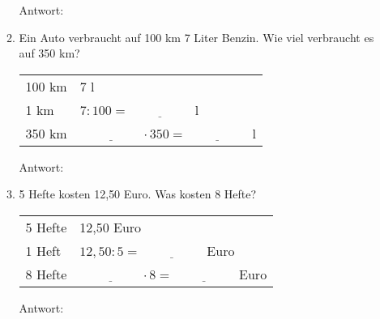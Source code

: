 \begin{enumerate}[label=\arabic*.]
\begin{enumerate}[label=\alph*)]
        Antwort: \underline{\hspace{4cm}}

        \vspace{1cm}

        \item Ein Auto verbraucht auf 100 km 7 Liter Benzin. Wie viel verbraucht es auf 350 km?

        \begin{tabular}{l|l}
            100 km & 7 l \\
            1 km & $7 : 100 = \underline{\hspace{2cm}}$ l \\
            350 km & $\underline{\hspace{2cm}} \cdot 350 = \underline{\hspace{2cm}}$ l \\
        \end{tabular}

        Antwort: \underline{\hspace{4cm}}

        \vspace{1cm}

        \item 5 Hefte kosten 12{,}50 Euro. Was kosten 8 Hefte?

        \begin{tabular}{l|l}
            5 Hefte & 12{,}50 Euro \\
            1 Heft & $12{,}50 : 5 = \underline{\hspace{2cm}}$ Euro \\
            8 Hefte & $\underline{\hspace{2cm}} \cdot 8 = \underline{\hspace{2cm}}$ Euro \\
        \end{tabular}

        Antwort: \underline{\hspace{4cm}}
    \end{enumerate}
\end{enumerate}